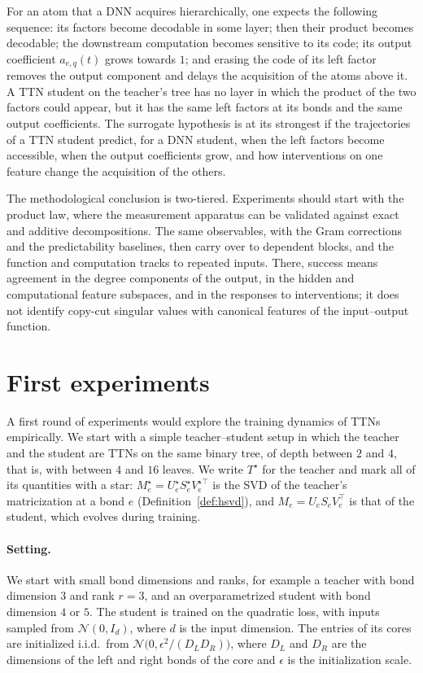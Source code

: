 \documentclass[11pt]{article}
\theoremstyle{definition}
\numberwithin{equation}{section}
\begin{document}
For an atom that a DNN acquires hierarchically, one expects the following sequence: its factors become decodable in some layer; then their product becomes decodable; the downstream computation becomes sensitive to its code; its output coefficient $a_{e,q}(t)$ grows towards $1$; and erasing the code of its left factor removes the output component and delays the acquisition of the atoms above it. A TTN student on the teacher's tree has no layer in which the product of the two factors could appear, but it has the same left factors at its bonds and the same output coefficients. The surrogate hypothesis is at its strongest if the trajectories of a TTN student predict, for a DNN student, when the left factors become accessible, when the output coefficients grow, and how interventions on one feature change the acquisition of the others.

The methodological conclusion is two-tiered. Experiments should start with the product law, where the measurement apparatus can be validated against exact and additive decompositions. The same observables, with the Gram corrections and the predictability baselines, then carry over to dependent blocks, and the function and computation tracks to repeated inputs. There, success means agreement in the degree components of the output, in the hidden and computational feature subspaces, and in the responses to interventions; it does not identify copy-cut singular values with canonical features of the input--output function.
\section{First experiments}\label{sec:first-experiments}
A first round of experiments would explore the training dynamics of TTNs empirically. We start with a simple teacher--student setup in which the teacher and the student are TTNs on the same binary tree, of depth between $2$ and $4$, that is, with between $4$ and $16$ leaves. We write $T^\star$ for the teacher and mark all of its quantities with a star: $M^\star_e=U^\star_eS^\star_eV^{\star\top}_e$ is the SVD of the teacher's matricization at a bond $e$ (Definition~\ref{def:hsvd}), and $M_e=U_eS_eV_e^\top$ is that of the student, which evolves during training.

\paragraph{Setting.} We start with small bond dimensions and ranks, for example a teacher with bond dimension $3$ and rank $r=3$, and an overparametrized student with bond dimension $4$ or $5$. The student is trained on the quadratic loss, with inputs sampled from $\mathcal N(0,I_d)$, where $d$ is the input dimension. The entries of its cores are initialized i.i.d.\ from $\mathcal N\big(0,\epsilon^2/(D_LD_R)\big)$, where $D_L$ and $D_R$ are the dimensions of the left and right bonds of the core and $\epsilon$ is the initialization scale.
\end{document}
